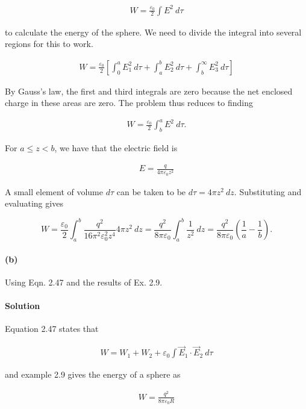 \documentclass{article}
\begin{document}
\begin{align*}
    W = \frac{\varepsilon_0}{2}\int E^2\ d\tau 
\end{align*}

to calculate the energy of the sphere. We need to divide the integral into several regions for this to work. 

\begin{align*}
    W = \frac{\varepsilon_0}{2}\left[ \int_0^a E^2_1\ d\tau + \int_a^b E^2_2\ d\tau + \int_b^{\infty} E^2_3\ d\tau \right]
\end{align*}

By Gauss's law, the first and third integrals are zero because the net enclosed charge in these areas are zero. The problem thus reduces to finding 

\begin{align*}
    W = \frac{\varepsilon_0}{2}\int_b^a E^2 \ d\tau.
\end{align*}

For $a \leq z < b$, we have that the electric field is 

\begin{align*}
    E = \frac{q}{4\pi\varepsilon_0 z^2}
\end{align*}

A small element of volume $d\tau$ can be taken to be $d\tau = 4\pi z^2\ dz$. Substituting and evaluating gives 

$$
W = \frac{\varepsilon_0}{2}\int_a^b \frac{q^2}{16\pi^2\varepsilon_0^2 z^4}4\pi z^2\
 dz = \frac{q^2}{8\pi\varepsilon_0}\int_a^b \frac{1}{z^2}\ dz = \frac{q^2}{8\pi\varepsilon_0}\left(\frac{1}{a} - \frac{1}{b} \right).
$$

\pagebreak

\paragraph{(b)} Using Eqn. 2.47 and the results of Ex. 2.9.

\paragraph{Solution} Equation 2.47 states that 

\begin{align*}
    W = W_1 + W_2 + \varepsilon_0\int \vec{E}_1\cdot \vec{E}_2\ d\tau
\end{align*}

and example 2.9 gives the energy of a sphere as 

\begin{align*}
    W = \frac{q^2}{8\pi\varepsilon_0R}
\end{align*}
\end{document}
